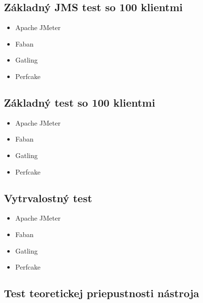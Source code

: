 \documentclass[12pt,oneside,final]{fithesis-utf8}
\begin{document}
\subsection{Základný JMS test so 100 klientmi}

\begin{itemize}

\item Apache JMeter

\item Faban

\item Gatling

\item Perfcake

\end{itemize}

\subsection{Základný test so 100 klientmi}

\begin{itemize}

\item Apache JMeter

\item Faban

\item Gatling

\item Perfcake

\end{itemize}

\subsection{Vytrvalostný test}

\begin{itemize}

\item Apache JMeter

\item Faban

\item Gatling

\item Perfcake

\end{itemize}

\subsection{Test teoretickej priepustnosti nástroja}
\end{document}
